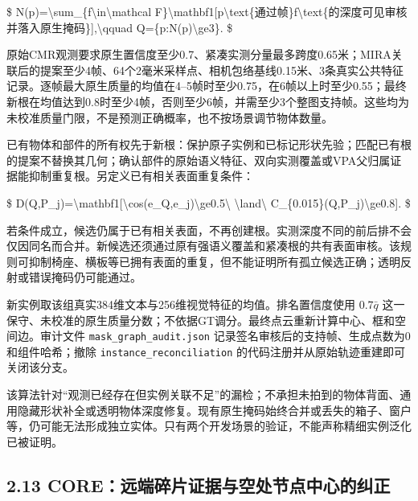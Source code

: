 \documentclass[UTF8,fontset=fandol]{ctexart}
\begin{document}
\$
N(p)=\textbackslash{}sum\_\{f\textbackslash{}in\textbackslash{}mathcal F\}\textbackslash{}mathbf1[p\textbackslash{}text\{通过帧\}f\textbackslash{}text\{的深度可见审核并落入原生掩码\}],\textbackslash{}qquad Q=\{p:N(p)\textbackslash{}ge3\}.
\$



原始CMR观测要求原生置信度至少0.7、紧凑实测分量最多跨度0.65米；MIRA关联后的提案至少4帧、64个2毫米采样点、相机包络基线0.15米、3条真实公共特征记录。逐帧最大原生质量的均值在4–5帧时至少0.75，在6帧以上时至少0.55；最终新根在均值达到0.8时至少4帧，否则至少6帧，并需至少3个整图支持帧。这些均为未校准质量门限，不是预测正确概率，也不按场景调节物体数量。



已有物体和部件的所有权先于新根：保护原子实例和已标记形状先验；匹配已有根的提案不替换其几何；确认部件的原始语义特征、双向实测覆盖或VPA父归属证据能抑制重复根。另定义已有相关表面重复条件：



\$
D(Q,P\_j)=\textbackslash{}mathbf1[\textbackslash{}cos(e\_Q,e\_j)\textbackslash{}ge0.5\textbackslash{} \textbackslash{}land\textbackslash{} C\_\{0.015\}(Q,P\_j)\textbackslash{}ge0.8].
\$



若条件成立，候选仍属于已有相关表面，不再创建根。实测深度不同的前后排不会仅因同名而合并。新候选还须通过原有强语义覆盖和紧凑根的共有表面审核。该规则可抑制椅座、横板等已拥有表面的重复，但不能证明所有孤立候选正确；透明反射或错误掩码仍可能通过。



新实例取该组真实384维文本与256维视觉特征的均值。排名置信度使用 $0.7\bar q$ 这一保守、未校准的原生质量分数；不依据GT调分。最终点云重新计算中心、框和空间边。审计文件 \texttt{mask\_\allowbreak{}graph\_\allowbreak{}audit.\allowbreak{}json} 记录签名审核后的支持帧、生成点数为0和组件哈希；撤除 \texttt{instance\_\allowbreak{}reconciliation} 的代码注册并从原始轨迹重建即可关闭该分支。



该算法针对“观测已经存在但实例关联不足”的漏检；不承担未拍到的物体背面、通用隐藏形状补全或透明物体深度修复。现有原生掩码始终合并或丢失的箱子、窗户等，仍可能无法形成独立实体。只有两个开发场景的验证，不能声称精细实例泛化已被证明。



\subsection*{2.13 CORE：远端碎片证据与空处节点中心的纠正}
\end{document}
